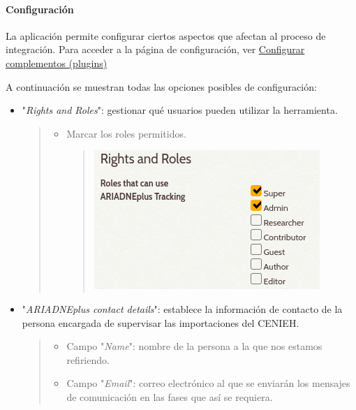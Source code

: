 \documentclass[
]{article}
\begin{document}
\hypertarget{configuraciuxf3n}{%
\paragraph{Configuración}\label{configuraciuxf3n}}

La aplicación permite configurar ciertos aspectos que afectan al proceso
de integración. Para acceder a la página de configuración, ver
\protect\hyperlink{configurar-complementos-plugins}{Configurar
complementos (plugins)}

A continuación se muestran todas las opciones posibles de configuración:

\begin{itemize}
\item
  "\emph{Rights and Roles}": gestionar qué usuarios pueden utilizar la
  herramienta.

  \begin{quote}
  \begin{itemize}
  \item
    Marcar los roles permitidos.

    \begin{quote}
    \includegraphics{../_static/images/at-cf-1.png}
    \end{quote}
  \end{itemize}
  \end{quote}
\item
  "\emph{ARIADNEplus contact details}": establece la información de
  contacto de la persona encargada de supervisar las importaciones del
  CENIEH.

  \begin{quote}
  \begin{itemize}
  \item
    Campo "\emph{Name}": nombre de la persona a la que nos estamos
    refiriendo.
  \item
    Campo "\emph{Email}": correo electrónico al que se enviarán los
    mensajes de comunicación en las fases que así se requiera.


\end{itemize}
\end{quote}
\end{itemize}
\end{document}
